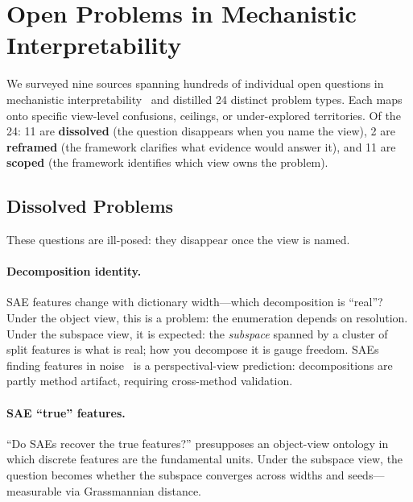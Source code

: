 \documentclass[11pt]{article}
\theoremstyle{remark}
\begin{document}
\section{Open Problems in Mechanistic Interpretability}\label{app:openprobs}

We surveyed nine sources spanning hundreds of individual open questions
in mechanistic interpretability~\citep{sharkey2025,nanda2022open,
apollo2024,schmidt2026,steinhardt2026,williams2025,mib2025}
and distilled 24 distinct problem types.  Each maps onto specific
view-level confusions, ceilings, or under-explored territories.
Of the 24: 11 are \textbf{dissolved} (the question disappears when you
name the view), 2 are \textbf{reframed} (the framework clarifies what
evidence would answer it), and 11 are \textbf{scoped} (the framework
identifies which view owns the problem).

\subsection{Dissolved Problems}

These questions are ill-posed: they disappear once the view is named.

\paragraph{Decomposition identity.}
SAE features change with dictionary width---which decomposition is
``real''?  Under the object view, this is a problem: the enumeration
depends on resolution.  Under the subspace view, it is expected: the
\emph{subspace} spanned by a cluster of split features is what is
real; how you decompose it is gauge freedom.  SAEs finding features
in noise~\citep{bricken2023} is a perspectival-view prediction:
decompositions are partly method artifact, requiring cross-method
validation.

\paragraph{SAE ``true'' features.}
``Do SAEs recover the true features?'' presupposes an object-view
ontology in which discrete features are the fundamental units.  Under
the subspace view, the question becomes whether the subspace converges
across widths and seeds---measurable via Grassmannian distance.
\end{document}
